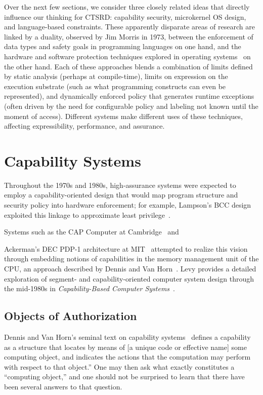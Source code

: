 Over the next few sections, we consider three closely related ideas that directly influence
our thinking for CTSRD: capability security, microkernel OS design, and
language-based constraints.
These apparently disparate areas of research are linked by a duality,
observed by Jim Morris
in 1973, between the enforcement of data types and safety goals in programming languages on one hand,
and the hardware and software protection techniques explored in operating
systems~\cite{morris:protectionprogramming} on the other hand.
Each of these approaches blends a combination of limits defined by static analysis
(perhaps at compile-time), limits on expression on the execution substrate (such as what
programming constructs can even be represented), and dynamically enforced policy that generates
runtime exceptions (often driven by the need for configurable policy and labeling not known
until the moment of access).
Different systems make different uses of these techniques, affecting expressibility,
performance, and assurance.

\section{Capability Systems} %

Throughout the 1970s and 1980s, high-assurance systems were expected
to employ a capability-oriented design that would map program
structure and security policy into hardware enforcement; for example,
Lampson's BCC design exploited this linkage to approximate least
privilege~\cite{lampson:dynamicprotection,lampson:protection}.

Systems such as the CAP Computer at Cambridge~\cite{WilkesNeedham79} and

Ackerman's DEC PDP-1 architecture at MIT~\cite{ackerman:multiprocessing}
attempted to realize this vision through embedding notions of capabilities in
the memory management unit of the CPU, an approach described by Dennis and Van
Horn~\cite{dennis:semantics}.  Levy provides a detailed exploration of segment-
and capability-oriented computer system design through the mid-1980s in {\em
Capability-Based Computer Systems}~\cite{levy:capabilities}.

\subsection{Objects of Authorization}

Dennis and Van Horn's seminal text on capability
systems~\cite{dennis:semantics} defines a capability as a structure that
locates by means of [a unique code or effective name] some computing object,
and indicates the actions that the computation may perform with respect to that
object.'' One may then ask what exactly constitutes a ``computing object,''
and one should not be surprised to learn that there have been several answers
to that question.

